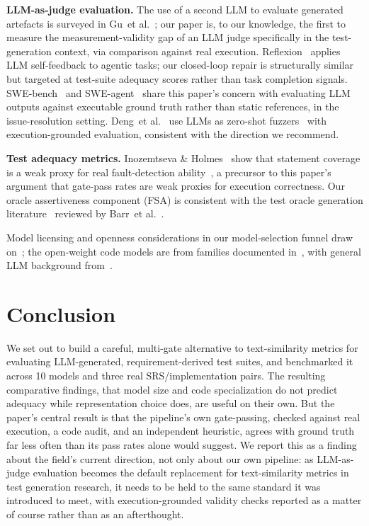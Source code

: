 \documentclass[conference]{IEEEtran}
\newcommand{\etal}{et al.}
\begin{document}
\textbf{LLM-as-judge evaluation.}
The use of a second LLM to evaluate generated artefacts is surveyed in
Gu~\etal~\cite{gu2024judgesurvey}; our paper is, to our knowledge, the
first to measure the measurement-validity gap of an LLM judge specifically
in the test-generation context, via comparison against real execution.
Reflexion~\cite{shinn2023reflexion} applies LLM self-feedback to agentic
tasks; our closed-loop repair is structurally similar but targeted at
test-suite adequacy scores rather than task completion signals.
SWE-bench~\cite{jimenez2024swebench} and SWE-agent~\cite{yang2024sweagent}
share this paper's concern with evaluating LLM outputs against executable
ground truth rather than static references, in the issue-resolution setting.
Deng~\etal~\cite{deng2023llmfuzzer} use LLMs as zero-shot fuzzers~\cite{xia2024fuzz4all} with
execution-grounded evaluation, consistent with the direction we recommend.

\textbf{Test adequacy metrics.}
Inozemtseva \& Holmes~\cite{inozemtseva2014coverage} show that statement
coverage is a weak proxy for real fault-detection ability~\cite{zhu1997adequacy,just2014mutants}, a precursor to
this paper's argument that gate-pass rates are weak proxies for execution
correctness. Our oracle assertiveness component (FSA) is consistent with
the test oracle generation literature~\cite{dinella2022toga,kang2023libro} reviewed by
Barr~\etal~\cite{barr2015oracle}.

Model licensing and openness considerations in our model-selection funnel
draw on~\cite{liesenfeld2023opening,white2024mof}; the open-weight code models are from
families documented in~\cite{grattafiori2024llama3,hui2024qwen25coder,yang2025qwen3,gemma2025gemma3,codegemma2024,deepseek2024coderv2,abdin2024phi3,granite4}, with
general LLM background from~\cite{ouyang2022instructgpt}.

\section{Conclusion}

We set out to build a careful, multi-gate alternative to text-similarity
metrics for evaluating LLM-generated, requirement-derived test suites, and
benchmarked it across 10 models and three real SRS/implementation pairs. The
resulting comparative findings, that model size and code specialization do
not predict adequacy while representation choice does, are useful on their
own. But the paper's central result is that the pipeline's own gate-passing,
checked against real execution, a code audit, and an independent heuristic,
agrees with ground truth far less often than its pass rates alone would
suggest. We report this as a finding about the field's current direction, not
only about our own pipeline: as LLM-as-judge evaluation becomes the default
replacement for text-similarity metrics in test generation research, it needs
to be held to the same standard it was introduced to meet, with
execution-grounded validity checks reported as a matter of course rather than
as an afterthought.
\end{document}
